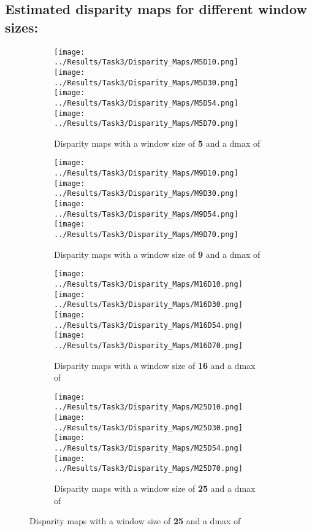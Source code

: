 \documentclass{article}
\begin{document}
\subsection{Estimated disparity maps for different window sizes:}
\begin{figure}[H]
    \centering
    \begin{subfigure}{\linewidth}
        \centering
        \texttt{[image: ../Results/Task3/Disparity\_Maps/M5D10.png]}
        \texttt{[image: ../Results/Task3/Disparity\_Maps/M5D30.png]}
        \texttt{[image: ../Results/Task3/Disparity\_Maps/M5D54.png]}
        \texttt{[image: ../Results/Task3/Disparity\_Maps/M5D70.png]}
        \caption{Disparity maps with a window size of \textbf{5} and a dmax of }
    \end{subfigure}
    \begin{subfigure}{\linewidth}
        \centering
        \texttt{[image: ../Results/Task3/Disparity\_Maps/M9D10.png]}
        \texttt{[image: ../Results/Task3/Disparity\_Maps/M9D30.png]}
        \texttt{[image: ../Results/Task3/Disparity\_Maps/M9D54.png]}
        \texttt{[image: ../Results/Task3/Disparity\_Maps/M9D70.png]}
        \caption{Disparity maps with a window size of \textbf{9} and a dmax of }
    \end{subfigure}
    \begin{subfigure}{\linewidth}
        \centering
        \texttt{[image: ../Results/Task3/Disparity\_Maps/M16D10.png]}
        \texttt{[image: ../Results/Task3/Disparity\_Maps/M16D30.png]}
        \texttt{[image: ../Results/Task3/Disparity\_Maps/M16D54.png]}
        \texttt{[image: ../Results/Task3/Disparity\_Maps/M16D70.png]}
        \caption{Disparity maps with a window size of \textbf{16} and a dmax of }
    \end{subfigure}
    \begin{subfigure}{\linewidth}
        \centering
        \texttt{[image: ../Results/Task3/Disparity\_Maps/M25D10.png]}
        \texttt{[image: ../Results/Task3/Disparity\_Maps/M25D30.png]}
        \texttt{[image: ../Results/Task3/Disparity\_Maps/M25D54.png]}
        \texttt{[image: ../Results/Task3/Disparity\_Maps/M25D70.png]}
        \caption{Disparity maps with a window size of \textbf{25} and a dmax of }
    \end{subfigure}
\end{figure}
\end{document}
